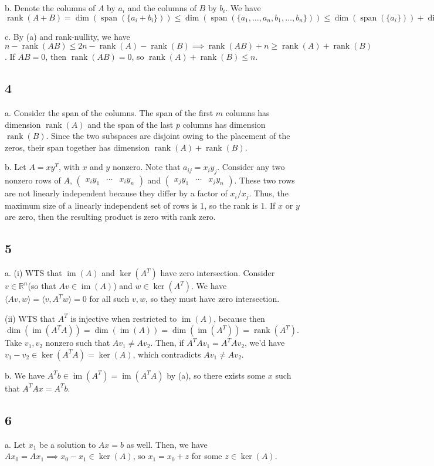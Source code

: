 \documentclass{article}
\newcommand{\openm}{\begin{pmatrix}}
\newcommand{\closem}{\end{pmatrix}}
\DeclareMathOperator{\rank}{rank}
\DeclareMathOperator{\im}{im}
\DeclareMathOperator{\Span}{span}
\newcommand{\rn}{\mathbb{R}}
\begin{document}
\noindent b. Denote the columns of $A$ by $a_i$ and the columns of $B$ by $b_i$. We have $\rank(A+B)=\dim(\Span(\{a_i+b_i\}))\leq\dim(\Span(\{a_1,\ldots,a_n,b_1,\ldots,b_n\}))\leq\dim(\Span(\{a_i\}))+\dim(\Span(\{b_i\}))$

\noindent c. By (a) and rank-nullity, we have $n-\rank(AB)\leq2n-\rank(A)-\rank(B)\implies\rank(AB)+n\geq\rank(A)+\rank(B)$. If $AB=0$, then $\rank(AB)=0$, so $\rank(A)+\rank(B)\leq n$.

\subsection*{4}
a. Consider the span of the columns. The span of the first $m$ columns has dimension $\rank(A)$ and the span of the last $p$ columns has dimension $\rank(B)$. Since the two subspaces are disjoint owing to the placement of the zeros, their span together has dimension $\rank(A)+\rank(B)$.

\noindent b. Let $A=xy^T$, with $x$ and $y$ nonzero. Note that $a_{ij}=x_iy_j$. Consider any two nonzero rows of $A$, $\openm x_iy_1&\cdots&x_iy_n\closem$ and $\openm x_jy_1&\cdots&x_jy_n\closem$. These two rows are not linearly independent because they differ by a factor of $x_i/x_j$. Thus, the maximum size of a linearly independent set of rows is $1$, so the rank is $1$. If $x$ or $y$ are zero, then the resulting product is zero with rank zero.

\subsection*{5}
a. (i) WTS that $\im(A)$ and $\ker(A^T)$ have zero intersection. Consider $v\in\rn^n$(so that $Av\in\im(A)$) and $w\in\ker(A^T)$. We have $\langle Av,w\rangle=\langle v,A^Tw\rangle=0$ for all such $v,w$, so they must have zero intersection. 

(ii) WTS that $A^T$ is injective when restricted to $\im(A)$, because then $\dim(\im(A^TA))=\dim(\im(A))=\dim(\im(A^T))=\rank(A^T)$. Take $v_1,v_2$ nonzero such that $Av_1\neq Av_2$. Then, if $A^TAv_1=A^TAv_2$, we'd have $v_1-v_2\in\ker(A^TA)=\ker(A)$, which contradicts $Av_1\neq Av_2$. 

\noindent b. We have $A^Tb\in\im(A^T)=\im(A^TA)$ by (a), so there exists some $x$ such that $A^TAx=A^Tb$.

\subsection*{6}
a. Let $x_1$ be a solution to $Ax=b$ as well. Then, we have $Ax_0=Ax_1\implies x_0-x_1\in\ker(A)$, so $x_1=x_0+z$ for some $z\in\ker(A)$.
\end{document}
